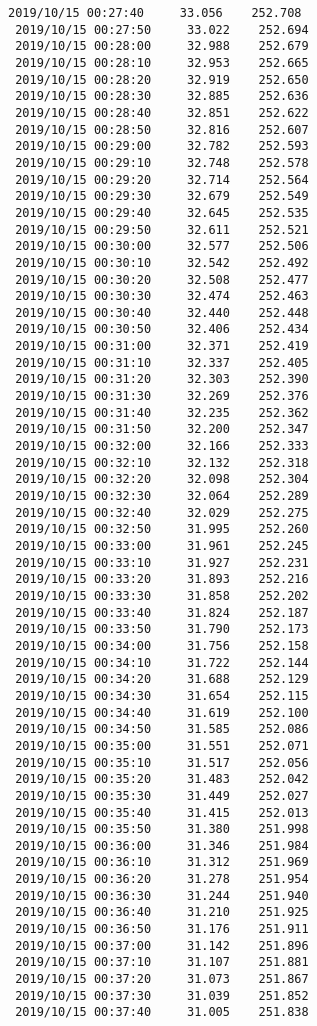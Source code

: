 \documentclass[11pt]{article}
\begin{document}
\begin{Verbatim}[commandchars=\\\{\}]
 2019/10/15 00:27:40     33.056    252.708
 2019/10/15 00:27:50     33.022    252.694
 2019/10/15 00:28:00     32.988    252.679
 2019/10/15 00:28:10     32.953    252.665
 2019/10/15 00:28:20     32.919    252.650
 2019/10/15 00:28:30     32.885    252.636
 2019/10/15 00:28:40     32.851    252.622
 2019/10/15 00:28:50     32.816    252.607
 2019/10/15 00:29:00     32.782    252.593
 2019/10/15 00:29:10     32.748    252.578
 2019/10/15 00:29:20     32.714    252.564
 2019/10/15 00:29:30     32.679    252.549
 2019/10/15 00:29:40     32.645    252.535
 2019/10/15 00:29:50     32.611    252.521
 2019/10/15 00:30:00     32.577    252.506
 2019/10/15 00:30:10     32.542    252.492
 2019/10/15 00:30:20     32.508    252.477
 2019/10/15 00:30:30     32.474    252.463
 2019/10/15 00:30:40     32.440    252.448
 2019/10/15 00:30:50     32.406    252.434
 2019/10/15 00:31:00     32.371    252.419
 2019/10/15 00:31:10     32.337    252.405
 2019/10/15 00:31:20     32.303    252.390
 2019/10/15 00:31:30     32.269    252.376
 2019/10/15 00:31:40     32.235    252.362
 2019/10/15 00:31:50     32.200    252.347
 2019/10/15 00:32:00     32.166    252.333
 2019/10/15 00:32:10     32.132    252.318
 2019/10/15 00:32:20     32.098    252.304
 2019/10/15 00:32:30     32.064    252.289
 2019/10/15 00:32:40     32.029    252.275
 2019/10/15 00:32:50     31.995    252.260
 2019/10/15 00:33:00     31.961    252.245
 2019/10/15 00:33:10     31.927    252.231
 2019/10/15 00:33:20     31.893    252.216
 2019/10/15 00:33:30     31.858    252.202
 2019/10/15 00:33:40     31.824    252.187
 2019/10/15 00:33:50     31.790    252.173
 2019/10/15 00:34:00     31.756    252.158
 2019/10/15 00:34:10     31.722    252.144
 2019/10/15 00:34:20     31.688    252.129
 2019/10/15 00:34:30     31.654    252.115
 2019/10/15 00:34:40     31.619    252.100
 2019/10/15 00:34:50     31.585    252.086
 2019/10/15 00:35:00     31.551    252.071
 2019/10/15 00:35:10     31.517    252.056
 2019/10/15 00:35:20     31.483    252.042
 2019/10/15 00:35:30     31.449    252.027
 2019/10/15 00:35:40     31.415    252.013
 2019/10/15 00:35:50     31.380    251.998
 2019/10/15 00:36:00     31.346    251.984
 2019/10/15 00:36:10     31.312    251.969
 2019/10/15 00:36:20     31.278    251.954
 2019/10/15 00:36:30     31.244    251.940
 2019/10/15 00:36:40     31.210    251.925
 2019/10/15 00:36:50     31.176    251.911
 2019/10/15 00:37:00     31.142    251.896
 2019/10/15 00:37:10     31.107    251.881
 2019/10/15 00:37:20     31.073    251.867
 2019/10/15 00:37:30     31.039    251.852
 2019/10/15 00:37:40     31.005    251.838

\end{Verbatim}
\end{document}
